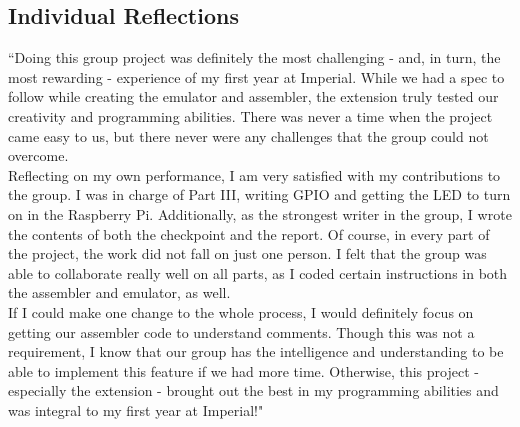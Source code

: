 \documentclass[11pt]{article}
\newenvironment{myquote}%
  {\list{}{\leftmargin=0.0in\rightmargin=0.0in}\item[]}%
  {\endlist}
\begin{document}
\subsection{Individual Reflections}

\begin{myquote}
``Doing this group project was definitely the most challenging - and, in turn, the most rewarding - experience of my first year at Imperial. While we had a spec to follow while creating the emulator and assembler, the extension truly tested our creativity and programming abilities. There was never a time when the project came easy to us, but there never were any challenges that the group could not overcome.
\\Reflecting on my own performance, I am very satisfied with my contributions to the group. I was in charge of Part III, writing GPIO and getting the LED to turn on in the Raspberry Pi. Additionally, as the strongest writer in the group, I wrote the contents of both the checkpoint and the report. Of course, in every part of the project, the work did not fall on just one person. I felt that the group was able to collaborate really well on all parts, as I coded certain instructions in both the assembler and emulator, as well.
\\If I could make one change to the whole process, I would definitely focus on getting our assembler code to understand comments. Though this was not a requirement, I know that our group has the intelligence and understanding to be able to implement this feature if we had more time. Otherwise, this project - especially the extension - brought out the best in my programming abilities and was integral to my first year at Imperial!"
\end{myquote}
\end{document}

